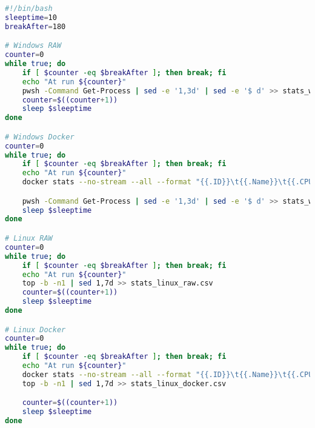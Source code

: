 
\begin{lstlisting}[language=bash, frame=single, caption={Bash script for performance monitoring},label=code::eval]
#!/bin/bash
sleeptime=10
breakAfter=180

# Windows RAW
counter=0
while true; do
    if [ $counter -eq $breakAfter ]; then break; fi
    echo "At run ${counter}"
    pwsh -Command Get-Process | sed -e '1,3d' | sed -e '$ d' >> stats_win_raw.csv
    counter=$((counter+1))
    sleep $sleeptime
done

# Windows Docker
counter=0
while true; do
    if [ $counter -eq $breakAfter ]; then break; fi
    echo "At run ${counter}"
    docker stats --no-stream --all --format "{{.ID}}\t{{.Name}}\t{{.CPUPerc}}\t{{.MemUsage}}\t{{.NetIO}}\t{{.BlockIO}}" cci-portal-webapp-1 cci-dm-cu-company-api-1 cci-dm-terminals-company-api-1 cci-db-1 >> stats_win_docker.txt

    pwsh -Command Get-Process | sed -e '1,3d' | sed -e '$ d' >> stats_win_docker.csv
    sleep $sleeptime
done

# Linux RAW
counter=0
while true; do
    if [ $counter -eq $breakAfter ]; then break; fi
    echo "At run ${counter}"
    top -b -n1 | sed 1,7d >> stats_linux_raw.csv
    counter=$((counter+1))
    sleep $sleeptime
done

# Linux Docker
counter=0
while true; do
    if [ $counter -eq $breakAfter ]; then break; fi
    echo "At run ${counter}"
    docker stats --no-stream --all --format "{{.ID}}\t{{.Name}}\t{{.CPUPerc}}\t{{.MemUsage}}\t{{.NetIO}}\t{{.BlockIO}}" cci_new_portal-webapp_1 cci_new_dm-cu-company-api_1 cci_new_dm-terminals-company-api_1 cci_new_db_1 >> stats_linux_docker.txt
    top -b -n1 | sed 1,7d >> stats_linux_docker.csv

    counter=$((counter+1))
    sleep $sleeptime
done
\end{lstlisting}
